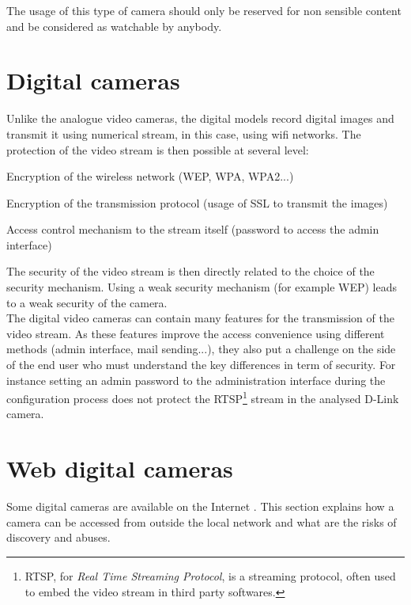 The usage of this type of camera should only be reserved for non sensible content and be considered as watchable by anybody.

\section{Digital cameras}
\label{sec:cam-digital}

Unlike the analogue video cameras, the digital models record digital images and transmit it using numerical stream, in this case, using wifi networks.
The protection of the video stream is then possible at several level:\\

\begin{itemizealt}
\item Encryption of the wireless network (WEP, WPA, WPA2...)
\item Encryption of the transmission protocol (usage of SSL to transmit the images)
\item Access control mechanism to the stream itself (password to access the admin interface)
\end{itemizealt}

The security of the video stream is then directly related to the choice of the security mechanism.
Using a weak security mechanism (for example WEP) leads to a weak security of the camera.\\

The digital video cameras can contain many features for the transmission of the video stream.
As these features improve the access convenience using different methods (admin interface, mail sending...), they also put a challenge on the side of the end user who must understand the key differences in term of security.
For instance setting an admin password to the administration interface during the configuration process does not protect the RTSP\footnote{RTSP, for \emph{Real Time Streaming Protocol}, is a streaming protocol, often used to embed the video stream in third party softwares.} stream in the analysed D-Link camera.

\section{Web digital cameras}
\label{sec:cam-google}

Some digital cameras are available on the Internet .
This section explains how a camera can be accessed from outside the local network and what are the risks of discovery and abuses.

